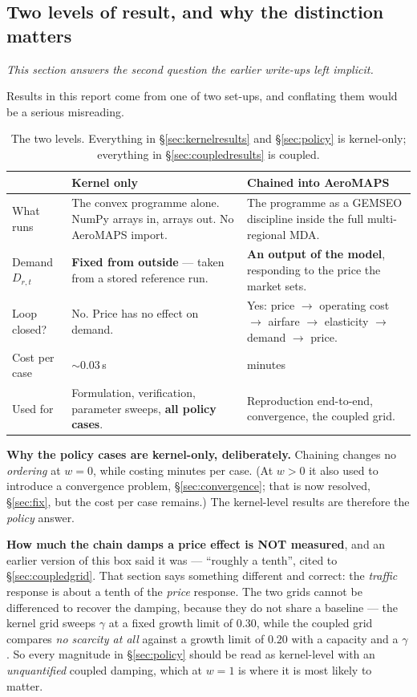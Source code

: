 \documentclass[11pt,a4paper]{article}
\begin{document}
\subsection{Two levels of result, and why the distinction matters}
\label{sec:twolevels}

\emph{This section answers the second question the earlier write-ups left implicit.}

Results in this report come from one of two set-ups, and conflating them would be a
serious misreading.

\begin{table}[h]
\centering\small
\begin{tabular}{@{}p{4.2cm}p{5.4cm}p{5.4cm}@{}}
\toprule
 & \textbf{Kernel only} & \textbf{Chained into AeroMAPS} \\
\midrule
What runs & The convex programme alone. NumPy arrays in, arrays out. No AeroMAPS import.
  & The programme as a GEMSEO discipline inside the full multi-regional MDA. \\
Demand $D_{r,t}$ & \textbf{Fixed from outside} --- taken from a stored reference run.
  & \textbf{An output of the model}, responding to the price the market sets. \\
Loop closed? & No. Price has no effect on demand. & Yes: price $\to$ operating cost
  $\to$ airfare $\to$ elasticity $\to$ demand $\to$ price. \\
Cost per case & $\sim$0.03\,s & minutes \\
Used for & Formulation, verification, parameter sweeps, \textbf{all policy cases}. &
  Reproduction end-to-end, convergence, the coupled grid. \\
\bottomrule
\end{tabular}
\caption{The two levels. Everything in \S\ref{sec:kernelresults} and \S\ref{sec:policy}
is kernel-only; everything in \S\ref{sec:coupledresults} is coupled.}
\label{tab:levels}
\end{table}

\begin{keybox}
\textbf{Why the policy cases are kernel-only, deliberately.} Chaining changes no
\emph{ordering} at $w=0$, while costing minutes per case. (At $w>0$ it also used to
introduce a convergence problem, \S\ref{sec:convergence}; that is now resolved,
\S\ref{sec:fix}, but the cost per case remains.) The kernel-level results are therefore
the \emph{policy} answer.

\textbf{How much the chain damps a price effect is NOT measured}, and an earlier version
of this box said it was --- ``roughly a tenth'', cited to \S\ref{sec:coupledgrid}. That
section says something different and correct: the \emph{traffic} response is about a
tenth of the \emph{price} response. The two grids cannot be differenced to recover the
damping, because they do not share a baseline --- the kernel grid sweeps $\gamma$ at a
fixed growth limit of $0.30$, while the coupled grid compares \emph{no scarcity at all}
against a growth limit of $0.20$ with a capacity and a $\gamma$. So every magnitude in
\S\ref{sec:policy} should be read as kernel-level with an \emph{unquantified} coupled
damping, which at $w=1$ is where it is most likely to matter.
\end{keybox}
\end{document}
